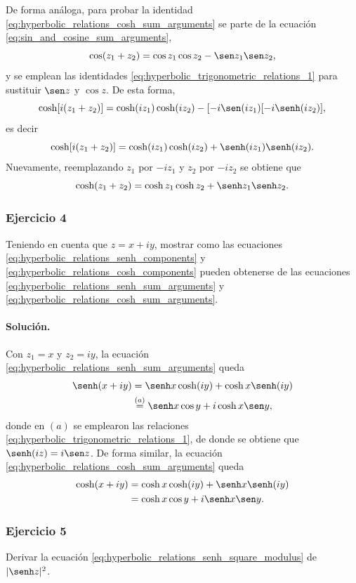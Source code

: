 \documentclass[a4paper]{report}
\begin{document}
De forma análoga, para probar la identidad \ref{eq:hyperbolic_relations_cosh_sum_arguments} se parte de la ecuación \ref{eq:sin_and_cosine_sum_arguments},
\[
 \cos(z_1+z_2)=\cos z_1\cos z_2-\sen z_1\sen z_2,
\]
y se emplean las identidades \ref{eq:hyperbolic_trigonometric_relations_1} para sustituir \(\sen z\) y \(\cos z\). De esta forma,
\[
 \cosh[i(z_1+z_2)]=\cosh(iz_1)\cosh(iz_2)-[-i\sen(iz_1)[-i\senh(iz_2)],
\]
es decir
\[
 \cosh[i(z_1+z_2)]=\cosh(iz_1)\cosh(iz_2)+\senh(iz_1)\senh(iz_2).
\]
Nuevamente, reemplazando \(z_1\) por \(-iz_1\) y \(z_2\) por \(-iz_2\) se obtiene que 
\[
 \cosh(z_1+z_2)=\cosh z_1\cosh z_2+\senh z_1\senh z_2.
\]

\subsubsection{Ejercicio 4}

Teniendo en cuenta que \(z=x+iy\), mostrar como las ecuaciones \ref{eq:hyperbolic_relations_senh_components} y \ref{eq:hyperbolic_relations_cosh_components} pueden obtenerse de las ecuaciones \ref{eq:hyperbolic_relations_senh_sum_arguments} y \ref{eq:hyperbolic_relations_cosh_sum_arguments}.

\paragraph{Solución.} Con \(z_1=x\) y \(z_2=iy\), la ecuación \ref{eq:hyperbolic_relations_senh_sum_arguments} queda
\begin{align*}
 \senh(x+iy)&=\senh x\cosh(iy)+\cosh x\senh(iy)\\
   &\overset{(a)}{=}\senh x\cos y+i\cosh x\sen y,
\end{align*}
donde en \((a)\) se emplearon las relaciones \ref{eq:hyperbolic_trigonometric_relations_1}, de donde se obtiene que \(\senh(iz)=i\sen z\). De forma similar, la ecuación \ref{eq:hyperbolic_relations_cosh_sum_arguments} queda
\begin{align*}
 \cosh(x+iy)&=\cosh x\cosh(iy)+\senh x\senh(iy)\\
   &=\cosh x\cos y+i\senh x\sen y.
\end{align*} 

\subsubsection{Ejercicio 5}

Derivar la ecuación \ref{eq:hyperbolic_relations_senh_square_modulus} de \(|\senh z|^2\).
\end{document}
